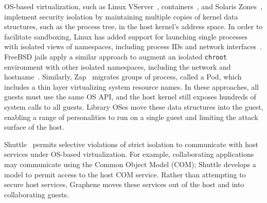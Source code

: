 OS-based virtualization, such as 
Linux VServer~\citep{vserver},  containers~\citep{bhattiprolu08containers},
and Solaris Zones~\citep{price04zones},
implement security isolation by maintaining multiple copies of kernel data structures,
such as the process tree,
in the host kernel's address space.
In order to facilitate sandboxing, 
Linux has added support for launching single processes
with isolated views of namespaces, including process IDs and network interfaces~\citep{lwn-namespaces}.
FreeBSD jails apply a similar approach to augment an isolated {\tt chroot} environment
with other isolated namespaces, including the network and hostname~\citep{jails}.
Similarly, Zap~\citep{osman02zap} migrates groups of process, called a Pod,
which includes a thin layer virtualizing system resource names.
In these approaches, all guests must use the same OS API, and the host kernel
still exposes hundreds of system calls to all guests.
Library OSes move these data structures into the guest, enabling
a range of personalities to run on a single guest and limiting the attack surface
of the host.


Shuttle~\citep{shan12shuttle} permits selective violations of strict isolation
to communicate with host services 
under OS-based virtualization.
For example, collaborating applications may communicate using the \win{} Common Object Model (COM);
Shuttle develops a model to permit access to the host COM service.
Rather than attempting to secure host services,
Graphene moves these services out of the host
and into collaborating guests.


